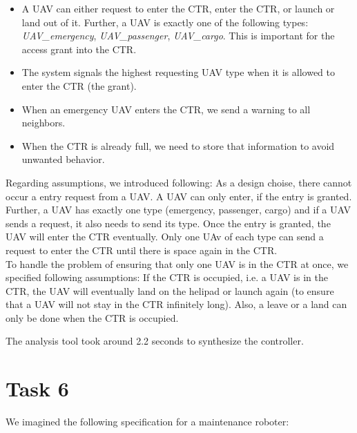 \documentclass[	runningheads,
				a4paper]{llncs}
\begin{document}
\begin{itemize}
    \item A UAV can either request to enter the CTR, enter the CTR, or launch or land out of it. Further, a UAV is exactly one of the following types: \textit{UAV\_emergency}, \textit{UAV\_passenger}, \textit{UAV\_cargo}. This is important for the access grant into the CTR.
    \item The system signals the highest requesting UAV type when it is allowed to enter the CTR (the grant).
    \item When an emergency UAV enters the CTR, we send a warning to all neighbors.
    \item When the CTR is already full, we need to store that information to avoid unwanted behavior.
\end{itemize}

Regarding assumptions, we introduced following: As a design choise, there cannot occur a entry request from a UAV. A UAV can only enter, if the entry is granted. Further, a UAV has exactly one type (emergency, passenger, cargo) and if a UAV sends a request, it also needs to send its type. Once the entry is granted, the UAV will enter the CTR eventually. Only one UAv of each type can send a request to enter the CTR until there is space again in the CTR.\\
To handle the problem of ensuring that only one UAV is in the CTR at once, we specified following assumptions: If the CTR is occupied, i.e. a UAV is in the CTR, the UAV will eventually land on the helipad or launch again (to ensure that a UAV will not stay in the CTR infinitely long). Also, a leave or a land can only be done when the CTR is occupied. 




The analysis tool took around 2.2 seconds to synthesize the controller.


\section{Task 6}


We imagined the following specification for a maintenance roboter:
\end{document}
